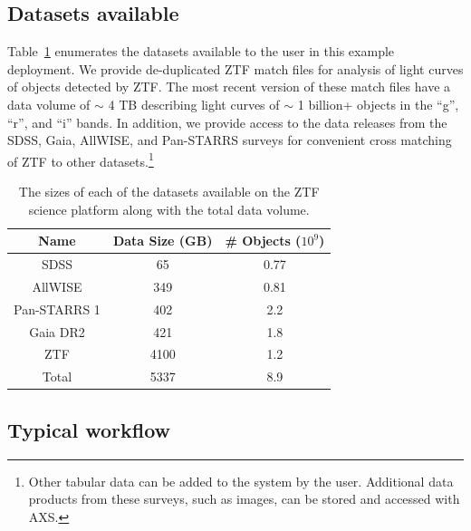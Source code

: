 \documentclass[twocolumn, linenumbers]{aastex631}
\begin{document}
\subsection{Datasets available}
\label{sec:ztf_data}

Table~\ref{tab:datasets} enumerates the datasets available to the user in this example deployment. We provide de-duplicated ZTF match files for analysis of light curves of objects detected by ZTF. The most recent version of these match files have a data volume of ${\sim}$ 4 TB describing light curves of ${\sim}$ 1 billion+ objects in the ``g'', ``r'', and ``i'' bands. In addition, we provide access to the data releases from the SDSS, Gaia, AllWISE, and Pan-STARRS surveys for convenient cross matching of ZTF to other datasets.\footnote{Other tabular data can be added to the system by the user. Additional data products from these surveys, such as images, can be stored and accessed with AXS.}

\begin{table}
    \centering
    \begin{tabular}{c|c|c}
        \textbf{Name} & \textbf{Data Size (GB)} & \textbf{\# Objects ($10^9$)}  \\\hline\hline
        SDSS & 65 & 0.77 \\
        AllWISE & 349 & 0.81 \\
        Pan-STARRS 1 & 402 & 2.2 \\
        Gaia DR2 & 421 & 1.8 \\
        ZTF & 4100 & 1.2 \\
        \hline\hline
        Total & 5337 & 8.9
    \end{tabular}
    \caption{The sizes of each of the datasets available on the ZTF science platform along with the total data volume.}
    \label{tab:datasets}
\end{table}

\subsection{Typical workflow}
\label{sec:ztf_access}
\end{document}
